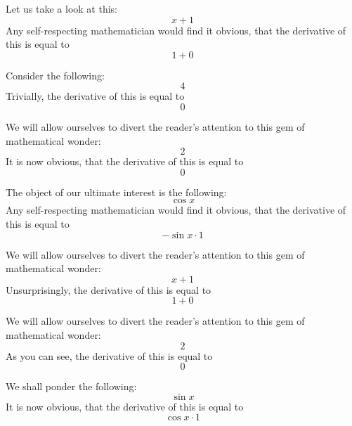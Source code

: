 \documentclass{article}
\begin{document}
Let us take a look at this:
\begin{equation}
x + 1 
\end{equation}
Any self-respecting mathematician would find it obvious, that the derivative of this is equal to
\begin{equation}
1 + 0 
\end{equation}

Consider the following:
\begin{equation}
4 
\end{equation}
Trivially, the derivative of this is equal to
\begin{equation}
0 
\end{equation}

We will allow ourselves to divert the reader's attention to this gem of mathematical wonder:
\begin{equation}
2 
\end{equation}
It is now obvious, that the derivative of this is equal to
\begin{equation}
0 
\end{equation}

The object of our ultimate interest is the following:
\begin{equation}
\cos x 
\end{equation}
Any self-respecting mathematician would find it obvious, that the derivative of this is equal to
\begin{equation}
-\sin x \cdot 1 
\end{equation}

We will allow ourselves to divert the reader's attention to this gem of mathematical wonder:
\begin{equation}
x + 1 
\end{equation}
Unsurprisingly, the derivative of this is equal to
\begin{equation}
1 + 0 
\end{equation}

We will allow ourselves to divert the reader's attention to this gem of mathematical wonder:
\begin{equation}
2 
\end{equation}
As you can see, the derivative of this is equal to
\begin{equation}
0 
\end{equation}

We shall ponder the following:
\begin{equation}
\sin x 
\end{equation}
It is now obvious, that the derivative of this is equal to
\begin{equation}
\cos x \cdot 1 
\end{equation}
\end{document}
